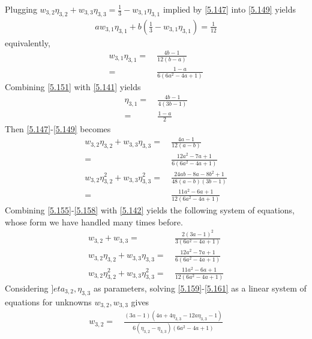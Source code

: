 \documentclass[a4paper]{article}
\numberwithin{equation}{section}
\begin{document}
\begin{enumerate}
Plugging ${w_{3,2}}{\eta _{3,2}} + {w_{3,3}}{\eta _{3,3}} = \frac{1}{3} - {w_{3,1}}{\eta _{3,1}}$ implied by \eqref{5.147} into \eqref{5.149} yields
\begin{align}
a{w_{3,1}}{\eta _{3,1}} + b\left( {\frac{1}{3} - {w_{3,1}}{\eta _{3,1}}} \right) = \frac{1}{{12}}
\end{align}
equivalently,
\begin{align}
\label{5.151}
{w_{3,1}}{\eta _{3,1}} =&\ \frac{{4b - 1}}{{12\left( {b - a} \right)}}\\
 =&\ \frac{{1 - a}}{{6\left( {6{a^2} - 4a + 1} \right)}}
\end{align}
Combining \eqref{5.151} with \eqref{5.141} yields
\begin{align}
{\eta _{3,1}} =&\ \frac{{4b - 1}}{{4\left( {3b - 1} \right)}}\\
 =&\ \frac{{1 - a}}{2} \label{5.154}
\end{align}
Then \eqref{5.147}-\eqref{5.149} becomes
\begin{align}
\label{5.155}
{w_{3,2}}{\eta _{3,2}} + {w_{3,3}}{\eta _{3,3}} =&\ \frac{{4a - 1}}{{12\left( {a - b} \right)}}\\
=&\ \frac{{12{a^2} - 7a + 1}}{{6\left( {6{a^2} - 4a + 1} \right)}}\\
{w_{3,2}}\eta _{3,2}^2 + {w_{3,3}}\eta _{3,3}^2 =&\ \frac{{24ab - 8a - 8{b^2} + 1}}{{48\left( {a - b} \right)\left( {3b - 1} \right)}}\\
 =&\ \frac{{11{a^2} - 6a + 1}}{{12\left( {6{a^2} - 4a + 1} \right)}} \label{5.158}
\end{align}
Combining \eqref{5.155}-\eqref{5.158} with \eqref{5.142} yields the following system of equations, whose form we have handled many times before.
\begin{align}
\label{5.159}
{w_{3,2}} + {w_{3,3}} =&\ \frac{{2{{\left( {3a - 1} \right)}^2}}}{{3\left( {6{a^2} - 4a + 1} \right)}}\\
{w_{3,2}}{\eta _{3,2}} + {w_{3,3}}{\eta _{3,3}} =&\ \frac{{12{a^2} - 7a + 1}}{{6\left( {6{a^2} - 4a + 1} \right)}}\\
{w_{3,2}}\eta _{3,2}^2 + {w_{3,3}}\eta _{3,3}^2 =&\ \frac{{11{a^2} - 6a + 1}}{{12\left( {6{a^2} - 4a + 1} \right)}} \label{5.161}
\end{align}
Considering $]eta _{3,2},\eta _{3,3}$ as parameters, solving \eqref{5.159}-\eqref{5.161} as a linear system of equations for unknowns $w_{3,2},w_{3,3}$ gives
\begin{align}
\label{5.162}
{w_{3,2}} =&\ \frac{{\left( {3a - 1} \right)\left( {4a + 4{\eta _{3,3}} - 12a{\eta _{3,3}} - 1} \right)}}{{6\left( {{\eta _{3,2}} - {\eta _{3,3}}} \right)\left( {6{a^2} - 4a + 1} \right)}}\\

\end{align}
\end{enumerate}
\end{document}
